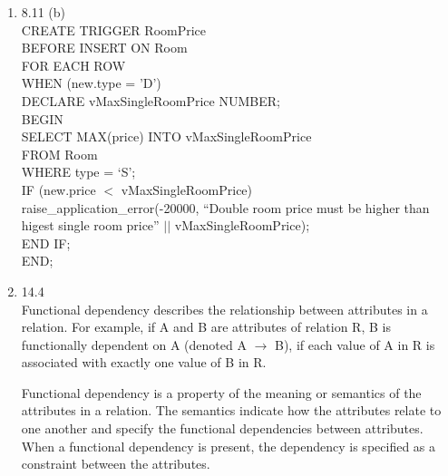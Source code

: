 \documentclass[10pt]{article}
\newcommand{\imply}{\to}
\begin{document}
\begin{enumerate}
\item 8.11 (b)\\
  CREATE TRIGGER RoomPrice\\
  BEFORE INSERT ON Room\\
  FOR EACH ROW\\
  WHEN (new.type = 'D')\\
  DECLARE vMaxSingleRoomPrice NUMBER;\\
  BEGIN\\
  \-\hspace{2em}SELECT MAX(price) INTO vMaxSingleRoomPrice\\
  \-\hspace{2em}FROM Room\\
  \-\hspace{2em}WHERE type = ‘S’;\\
  \-\hspace{2em}IF (new.price $<$ vMaxSingleRoomPrice)\\
  \-\hspace{4em}raise\_application\_error(-20000, ``Double room price
  must be higher than higest single room price'' $||$ vMaxSingleRoomPrice);\\
  \-\hspace{2em}END IF;\\
  END;\\

\item 14.4\\
  Functional dependency describes the relationship between attributes
  in a relation. For example, if A and B are attributes of relation R,
  B is functionally dependent on A (denoted A $\imply$ B), if each value of A
  in R is associated with exactly one value of B in R.

  Functional dependency is a property of the meaning or semantics of
  the attributes in a relation. The semantics indicate how the
  attributes relate to one another and specify the functional
  dependencies between attributes. When a functional dependency is
  present, the dependency is specified as a constraint between the attributes.


\end{enumerate}
\end{document}
